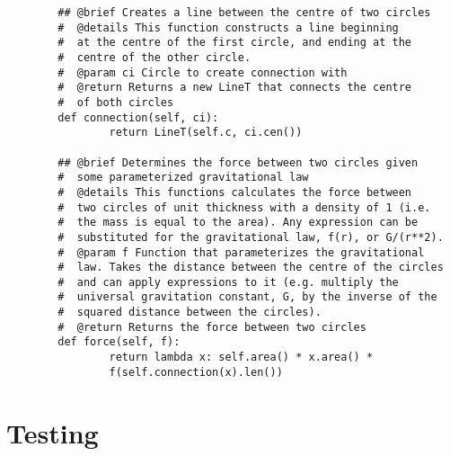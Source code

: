 \documentclass{article}
\begin{document}
\begin{lstlisting}
        ## @brief Creates a line between the centre of two circles
        #  @details This function constructs a line beginning 
        #  at the centre of the first circle, and ending at the
        #  centre of the other circle.
        #  @param ci Circle to create connection with
        #  @return Returns a new LineT that connects the centre 
        #  of both circles
        def connection(self, ci):
                return LineT(self.c, ci.cen())

        ## @brief Determines the force between two circles given 
        #  some parameterized gravitational law
        #  @details This functions calculates the force between 
        #  two circles of unit thickness with a density of 1 (i.e. 
        #  the mass is equal to the area). Any expression can be 
        #  substituted for the gravitational law, f(r), or G/(r**2).
        #  @param f Function that parameterizes the gravitational 
        #  law. Takes the distance between the centre of the circles 
        #  and can apply expressions to it (e.g. multiply the 
        #  universal gravitation constant, G, by the inverse of the 
        #  squared distance between the circles).
        #  @return Returns the force between two circles 
        def force(self, f):
                return lambda x: self.area() * x.area() *
                f(self.connection(x).len())

\end{lstlisting}

\section{Testing}
\end{document}
